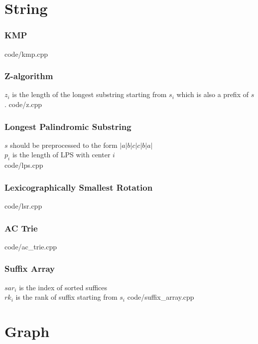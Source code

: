 \documentclass [landscape,8pt,a4paper,twocolumn]{article}
\begin{document}
\newpage
\part{String}

\section{KMP}
 {code/kmp.cpp}

\section{Z-algorithm}
$ z_i $ is the length of the longest substring starting from $ s_i $ which is also a prefix of $ s $.
 {code/z.cpp}

\section{Longest Palindromic Substring}
$ s $ should be preprocessed to the form $ |a|b|c|c|b|a| $\\
$ p_i $ is the length of  LPS with center $ i $\\
 {code/lps.cpp}

\section{Lexicographically Smallest Rotation}
 {code/lsr.cpp}

\vfill\null

\section{AC Trie}
 {code/ac_trie.cpp}

\vfill\null

\section{Suffix Array}
$ sar_i $ is the index of sorted suffices \\
$ rk_i $ is the rank of suffix starting from $ s_i $
 {code/suffix_array.cpp}

\newpage
\part{Graph}
\end{document}
